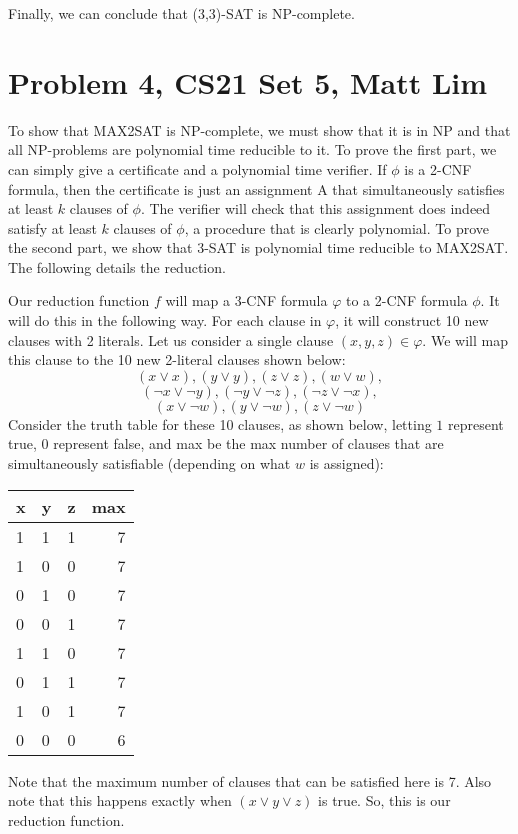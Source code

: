 \documentclass{article}
\begin{document}
Finally, we can conclude that (3,3)-SAT is NP-complete.
\newpage

\section*{Problem 4, CS21 Set 5, Matt Lim}
To show that MAX2SAT is NP-complete, we must show that it is in NP and that
all NP-problems are polynomial time reducible to it. To prove the first part,
we can simply give a certificate and a polynomial time verifier. If $\phi$ is
a 2-CNF formula, then the certificate is just an assignment A that
simultaneously satisfies at least $k$ clauses of $\phi$. The verifier will
check that this assignment does indeed satisfy at least $k$ clauses of $\phi$,
a procedure that is clearly polynomial. To prove the second part, we show that
3-SAT is polynomial time reducible to MAX2SAT. The following details the
reduction.

Our reduction function $f$ will map a 3-CNF formula $\varphi$ to a 2-CNF
formula $\phi$. It will do this in the following way. For each clause in
$\varphi$, it will construct 10 new clauses with 2 literals. Let us consider
a single clause $(x, y, z) \in \varphi$. We will map this clause to the
10 new 2-literal clauses shown below:
\[ (x \vee x), (y \vee y), (z \vee z), (w \vee w), \]
\[ (\neg x \vee \neg y), (\neg y \vee \neg z), (\neg z \vee \neg x), \]
\[ (x \vee \neg w), (y \vee \neg w), (z \vee \neg w) \]
Consider the truth table for these 10 clauses, as shown below, letting $1$
represent true, $0$ represent false, and max be the max number of clauses
that are simultaneously satisfiable (depending on what $w$ is assigned):
\begin{center}
  \begin{tabular}{ | l | l | c | r | }
    \hline
    x & y & z & max \\ \hline
    1 & 1 & 1 & 7 \\ \hline
    1 & 0 & 0 & 7 \\ \hline
    0 & 1 & 0 & 7 \\ \hline
    0 & 0 & 1 & 7 \\ \hline
    1 & 1 & 0 & 7 \\ \hline
    0 & 1 & 1 & 7 \\ \hline
    1 & 0 & 1 & 7 \\ \hline
    0 & 0 & 0 & 6 \\ \hline
  \end{tabular}
\end{center}
Note that the maximum number of clauses that can be satisfied here is 7. Also
note that this happens exactly when $(x \vee y \vee z)$ is true. So, this
is our reduction function.
\end{document}
